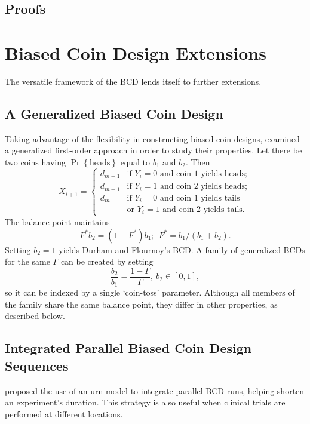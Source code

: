 \subsection{Proofs}

\section{Biased Coin Design Extensions}

The versatile framework of the BCD lends itself to further extensions.

\subsection{A Generalized Biased Coin Design}
Taking advantage of the flexibility in constructing biased coin designs, \cite{Bort:Giov:Upan:2005} examined a generalized first-order approach in order to study their properties. Let there be two coins having $\Pr\left\{\textrm{heads}\right\}$ equal to $b_1$ and $b_2$. Then
\begin{equation}\label{eq:BortotCombo}
X_{i+1}=
\begin{cases}
d_{m+1} &\textrm{if $Y_i=0$ and coin 1 yields heads};\\
d_{m-1} &\textrm{if $Y_i=1$ and coin 2 yields heads};\\
d_{m} &\textrm{if $Y_i=0$ and coin 1 yields tails}\\
        & \textrm{or $Y_i=1$ and coin 2 yields tails.}
\end{cases}
\end{equation}
\noindent The balance point maintains
\begin{equation*}
F^*b_2=\left(1-F^*\right)b_1;\ \ F^*=b_1/(b_1+b_2).
\end{equation*}
\noindent Setting $b_2=1$ yields Durham and Flournoy's BCD. A family of generalized BCDs for the same $\Gamma$ can be created by setting $$\frac{b_2}{b_1}=\frac{1-\Gamma}{\Gamma},\ b_2\in [0,1],$$ so it can be indexed by a single `coin-toss' parameter. Although all members of the family share the same balance point, they differ in other properties, as described below.

\subsection{Integrated Parallel Biased Coin Design Sequences}
\cite{Flou:aran:1998} proposed the use of an urn model to integrate parallel BCD runs, helping shorten an experiment's duration. This strategy is also useful when clinical trials are performed at different locations.

